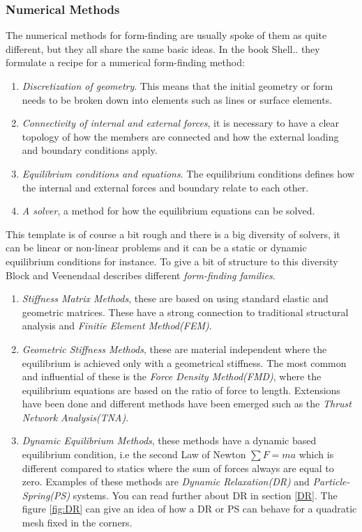 \subsubsection{Numerical Methods} \label{numerical Methods}

The numerical methods for form-finding are usually spoke of them as quite different, but they all share the same basic ideas. In the book Shell.. they formulate a recipe for a numerical form-finding method:\\

\begin{enumerate}
    \item \textit{Discretization of geometry}. This means that the initial geometry or form needs to be broken down into elements such as lines or surface elements.
    \item \textit{Connectivity of internal and external forces}, it is necessary to have a clear topology of how the members are connected and how the external loading and boundary conditions apply.
    \item \textit{Equilibrium conditions and equations}. The equilibrium conditions defines how the internal and external forces and boundary relate to each other. 
    \item \textit{A solver}, a method for how the equilibrium equations can be solved.
\end{enumerate}
\vspace{5mm}

This template is of course a bit rough and there is a big diversity of solvers, it can be linear or non-linear problems and it can be a static or dynamic equilibrium conditions for instance. To give a bit of structure to this diversity Block and Veenendaal describes different \textit{form-finding families}.\\ 


\begin{enumerate}
\item \textit{Stiffness Matrix Methods}, these are based on using standard elastic and geometric matrices. These have a strong connection to traditional structural analysis and \textit{Finitie Element Method(FEM)}.
\item \textit{Geometric Stiffness Methods}, these are material independent where the equilibrium is achieved only with a geometrical stiffness. The most common and influential of these is the \textit{Force Density Method(FMD)}, where the equilibrium equations are based on the ratio of force to length. Extensions have been done and different methods have been emerged such as the \textit{Thrust Network Analysis(TNA)}.
\item \textit{Dynamic Equilibrium Methods}, these methods have a dynamic based equilibrium condition, i.e the second Law of Newton $\sum F = ma$ which is different compared to statics where the sum of forces always are equal to zero. Examples of these methods are \textit{Dynamic Relaxation(DR)} and \textit{Particle-Spring(PS)} systems. You can read further about DR in section \ref{DR}. The figure \ref{fig:DR} can give an idea of how a DR or PS can behave for a quadratic mesh fixed in the corners. 
\end{enumerate}

